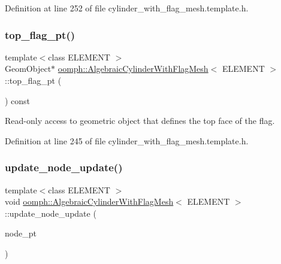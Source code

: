 Definition at line 252 of file cylinder\+\_\+with\+\_\+flag\+\_\+mesh.\+template.\+h.

\mbox{\label{classoomph_1_1AlgebraicCylinderWithFlagMesh_a06bc13adad4aaa037d989bba9e3bf79d}} 
\subsubsection{\texorpdfstring{top\+\_\+flag\+\_\+pt()}{top\_flag\_pt()}}
{\footnotesize\ttfamily template$<$class E\+L\+E\+M\+E\+NT $>$ \\
Geom\+Object$\ast$ \hyperlink{classoomph_1_1AlgebraicCylinderWithFlagMesh}{oomph\+::\+Algebraic\+Cylinder\+With\+Flag\+Mesh}$<$ E\+L\+E\+M\+E\+NT $>$\+::top\+\_\+flag\+\_\+pt (\begin{DoxyParamCaption}{ }\end{DoxyParamCaption}) const\hspace{0.3cm}{\ttfamily [inline]}}



Read-\/only access to geometric object that defines the top face of the flag. 



Definition at line 245 of file cylinder\+\_\+with\+\_\+flag\+\_\+mesh.\+template.\+h.

\mbox{\label{classoomph_1_1AlgebraicCylinderWithFlagMesh_a9d909de1db84a3b7e42494535b152d92}} 
\subsubsection{\texorpdfstring{update\+\_\+node\+\_\+update()}{update\_node\_update()}}
{\footnotesize\ttfamily template$<$class E\+L\+E\+M\+E\+NT $>$ \\
void \hyperlink{classoomph_1_1AlgebraicCylinderWithFlagMesh}{oomph\+::\+Algebraic\+Cylinder\+With\+Flag\+Mesh}$<$ E\+L\+E\+M\+E\+NT $>$\+::update\+\_\+node\+\_\+update (\begin{DoxyParamCaption}\item[{Algebraic\+Node $\ast$\&}]{node\+\_\+pt }\end{DoxyParamCaption})\hspace{0.3cm}{\ttfamily [inline]}}




